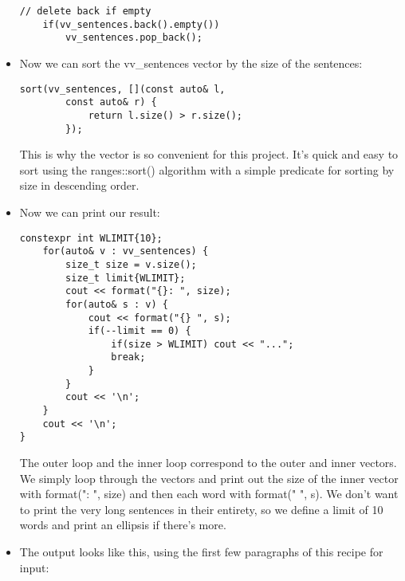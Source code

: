 \begin{itemize}
\begin{lstlisting}[style=styleCXX]
	// delete back if empty
	if(vv_sentences.back().empty())
		vv_sentences.pop_back();
\end{lstlisting}

\item 
Now we can sort the vv\_sentences vector by the size of the sentences:

\begin{lstlisting}[style=styleCXX]
	sort(vv_sentences, [](const auto& l,
		const auto& r) {
			return l.size() > r.size();
		});
\end{lstlisting}

This is why the vector is so convenient for this project. It's quick and easy to sort using the ranges::sort() algorithm with a simple predicate for sorting by size in descending order.

\item 
Now we can print our result:

\begin{lstlisting}[style=styleCXX]
	constexpr int WLIMIT{10};
	for(auto& v : vv_sentences) {
		size_t size = v.size();
		size_t limit{WLIMIT};
		cout << format("{}: ", size);
		for(auto& s : v) {
			cout << format("{} ", s);
			if(--limit == 0) {
				if(size > WLIMIT) cout << "...";
				break;
			}
		}
		cout << '\n';
	}
	cout << '\n';
}
\end{lstlisting}

The outer loop and the inner loop correspond to the outer and inner vectors. We simply loop through the vectors and print out the size of the inner vector with format("{}: ", size) and then each word with format("{} ", s). We don't want to print the very long sentences in their entirety, so we define a limit of 10 words and print an ellipsis if there's more.

\item 
The output looks like this, using the first few paragraphs of this recipe for input:


\end{itemize}


